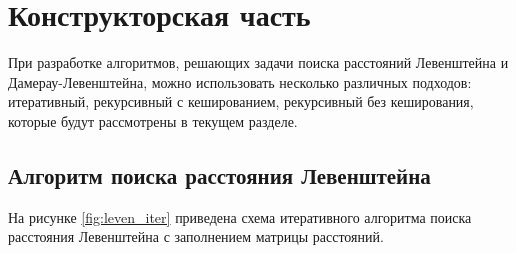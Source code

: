 \chapter{Конструкторская часть}

 При разработке алгоритмов, решающих задачи поиска расстояний Левенштейна и Дамерау-Левенштейна, можно использовать несколько различных подходов: итеративный, рекурсивный с кешированием, рекурсивный без кеширования, которые будут рассмотрены в текущем разделе.
 

\section{Алгоритм поиска расстояния Левенштейна}

На рисунке \ref{fig:leven_iter} приведена схема итеративного алгоритма поиска расстояния Левенштейна с заполнением матрицы расстояний.

